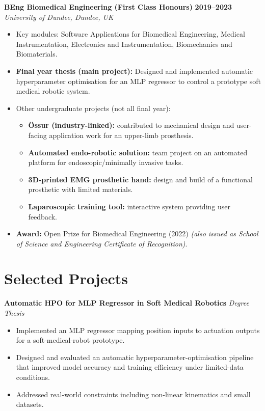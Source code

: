 \documentclass[a4paper,11pt]{article}
\begin{document}
\textbf{BEng Biomedical Engineering (First Class Honours)} \hfill \textbf{2019--2023}\\
\textit{University of Dundee, Dundee, UK}
\begin{itemize}
    \item Key modules: Software Applications for Biomedical Engineering, Medical Instrumentation, Electronics and Instrumentation, Biomechanics and Biomaterials.
    \item \textbf{Final year thesis (main project):} Designed and implemented automatic hyperparameter optimisation for an MLP regressor to control a prototype soft medical robotic system.
    \item Other undergraduate projects (not all final year):
    \begin{itemize}
        \item \textbf{Össur (industry-linked):} contributed to mechanical design and user-facing application work for an upper-limb prosthesis.
        \item \textbf{Automated endo-robotic solution:} team project on an automated platform for endoscopic/minimally invasive tasks.
        \item \textbf{3D-printed EMG prosthetic hand:} design and build of a functional prosthetic with limited materials.
        \item \textbf{Laparoscopic training tool:} interactive system providing user feedback.
    \end{itemize}
    \item \textbf{Award:} Open Prize for Biomedical Engineering (2022) \emph{(also issued as School of Science and Engineering Certificate of Recognition)}.
\end{itemize}


\section*{Selected Projects}

\textbf{Automatic HPO for MLP Regressor in Soft Medical Robotics} \hfill \textit{Degree Thesis}
\begin{itemize}
    \item Implemented an MLP regressor mapping position inputs to actuation outputs for a soft-medical-robot prototype.
    \item Designed and evaluated an automatic hyperparameter-optimisation pipeline that improved model accuracy and training efficiency under limited-data conditions.
    \item Addressed real-world constraints including non-linear kinematics and small datasets.
\end{itemize}
\end{document}
